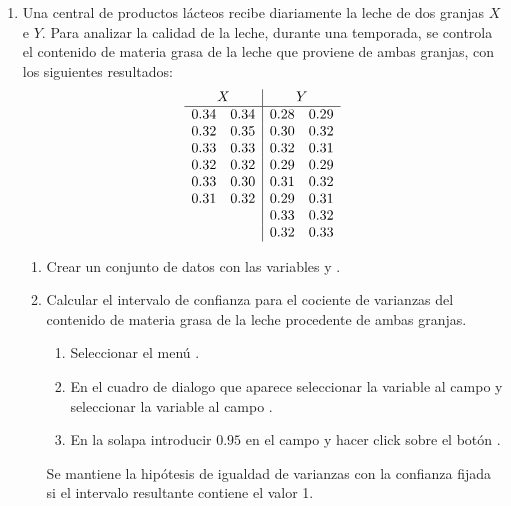 \begin{enumerate}[leftmargin=*]
\item  Una central de productos lácteos recibe diariamente la leche de dos granjas $X$ e $Y$. Para analizar la calidad de
la leche, durante una temporada, se controla el contenido de materia grasa de la leche que proviene de ambas granjas, con
los siguientes resultados:
\[
\begin{array}{ll|ll}
\multicolumn{2}{c|}{X} & \multicolumn{2}{c}{Y} \\
\hline
0.34 & 0.34 & 0.28 & 0.29 \\
0.32 & 0.35 & 0.30 & 0.32 \\
0.33 & 0.33 & 0.32 & 0.31 \\
0.32 & 0.32 & 0.29 & 0.29 \\
0.33 & 0.30 & 0.31 & 0.32 \\
0.31 & 0.32 & 0.29 & 0.31 \\
 &  & 0.33 & 0.32 \\
 &  & 0.32 & 0.33 \\
\end{array}
\]

\begin{enumerate}
\item Crear un conjunto de datos con las variables  y .

\item Calcular el intervalo de confianza para el cociente de varianzas del contenido de materia grasa de la leche procedente de ambas
granjas. 
\begin{indicacion}{
\begin{enumerate}
\item Seleccionar el menú .
\item En el cuadro de dialogo que aparece seleccionar la variable  al campo  y seleccionar la variable  al campo .
\item En la solapa  introducir $0.95$ en el campo  y hacer click sobre el botón .
\end{enumerate}
Se mantiene la hipótesis de igualdad de varianzas con la confianza fijada si el intervalo resultante contiene el valor 1. 
}
\end{indicacion}


\end{enumerate}
\end{enumerate}
